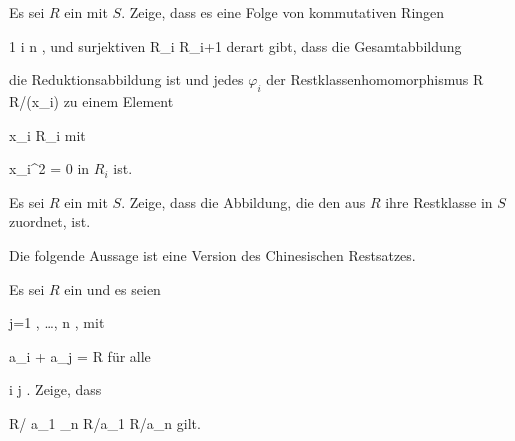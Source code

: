 {}
{





Es sei $R$ ein
mit
$S$. Zeige, dass es eine Folge von kommutativen Ringen

 {}
 {1 \leq i \leq n} {}
 {} {} {} {,}
und surjektiven
 {R_i } { R_{i+1}
} {}
derart gibt, dass die Gesamtabbildung

 {  }

die Reduktionsabbildung ist und jedes $\varphi_i$ der Restklassenhomomorphismus
\maabbdisp {} { R } { R/(x_i)
} {}
zu einem Element

\mavergleichskette
{\vergleichskette
{ x_i
}
{ \in }{ R_i
}
{  }{
}
{    }{
}
{   }{
}
}
{}{}{}
mit

\mavergleichskette
{\vergleichskette
{ x_i^2
}
{ = }{ 0
}
{  }{
}
{    }{
}
{   }{
}
}
{}{}{}
in $R_i$ ist.





}
{} {}

{}
{





Es sei $R$ ein
mit
$S$. Zeige, dass die Abbildung, die den
aus $R$ ihre Restklasse in $S$ zuordnet,
ist.





}
{} {}

Die folgende Aussage ist eine Version des Chinesischen Restsatzes.

{}
{





Es sei $R$ ein
und es seien

 {}
 {j=1  , \ldots , n} {}
 {} {} {} {,}
mit

\mavergleichskette
{\vergleichskette
{ {\mathfrak a}_i + {\mathfrak a}_j
}
{ = }{ R
}
{  }{
}
{    }{
}
{   }{
}
}
{}{}{}
für alle

\mavergleichskette
{\vergleichskette
{i
}
{ \neq }{j
}
{  }{
}
{    }{
}
{   }{
}
}
{}{}{.}
Zeige, dass

\mavergleichskettedisp
{\vergleichskette
{R/  {\mathfrak a}_1 _n
}
{ \cong} { R/{\mathfrak a}_1 \times \cdots \times  R/{\mathfrak a}_n
}
{ } {
}
{ } {
}
{ } {
}
}
{}{}{}
gilt.





}
{} {}





